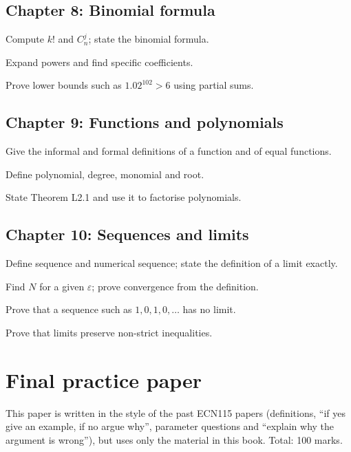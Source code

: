 \subsection*{Chapter 8: Binomial formula}
\begin{checklist}
  \item Compute $k!$ and $C_n^j$; state the binomial formula.
  \item Expand powers and find specific coefficients.
  \item Prove lower bounds such as $1.02^{102}>6$ using partial sums.
\end{checklist}
\subsection*{Chapter 9: Functions and polynomials}
\begin{checklist}
  \item Give the informal and formal definitions of a function and of equal functions.
  \item Define polynomial, degree, monomial and root.
  \item State Theorem L2.1 and use it to factorise polynomials.
\end{checklist}
\subsection*{Chapter 10: Sequences and limits}
\begin{checklist}
  \item Define sequence and numerical sequence; state the definition of a limit exactly.
  \item Find $N$ for a given $\varepsilon$; prove convergence from the definition.
  \item Prove that a sequence such as $1,0,1,0,\dots$ has no limit.
  \item Prove that limits preserve non-strict inequalities.
\end{checklist}

\section*{Final practice paper}

This paper is written in the style of the past ECN115 papers (definitions, ``if yes give an example, if no argue why'',
parameter questions and ``explain why the argument is wrong''), but uses only the material in this book. Total: 100 marks.

